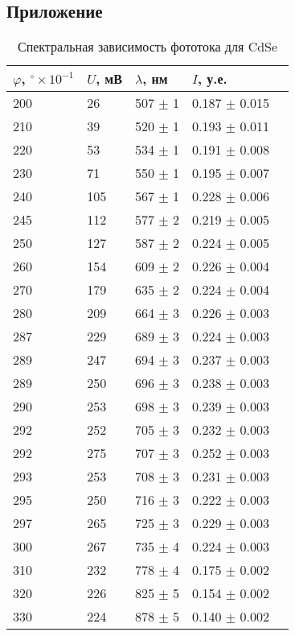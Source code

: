 \subsection*{Приложение}



\begin{table}[h]
    \centering
    \caption{Спектральная зависимость фототока для CdSe}
\begin{tabular}{lllll}
\toprule
$\varphi$, ${}^{\circ} \times 10^{-1} $ &
$U$, мВ &           
$\lambda$, нм &
$I$, у.е.& \\
\midrule
200 &   26 &  507 $\pm$ 1 &    0.187 $\pm$ 0.015 \\
210 &   39 &  520 $\pm$ 1 &    0.193 $\pm$ 0.011 \\
220 &   53 &  534 $\pm$ 1 &  0.191 $\pm$ 0.008 \\
230 &   71 &  550 $\pm$ 1 &  0.195 $\pm$ 0.007 \\
240 &  105 &  567 $\pm$ 1 &  0.228 $\pm$ 0.006 \\
245 &  112 &  577 $\pm$ 2 &   0.219 $\pm$ 0.005 \\
250 &  127 &  587 $\pm$ 2 &  0.224 $\pm$ 0.005 \\
260 &  154 &  609 $\pm$ 2 &  0.226 $\pm$ 0.004 \\
270 &  179 &  635 $\pm$ 2 &  0.224 $\pm$ 0.004 \\
280 &  209 &  664 $\pm$ 3 &   0.226 $\pm$ 0.003 \\
287 &  229 &  689 $\pm$ 3 &  0.224 $\pm$ 0.003 \\
289 &  247 &  694 $\pm$ 3 &   0.237 $\pm$ 0.003 \\
289 &  250 &  696 $\pm$ 3 &  0.238 $\pm$ 0.003 \\
290 &  253 &  698 $\pm$ 3 &  0.239 $\pm$ 0.003 \\
292 &  252 &  705 $\pm$ 3 &  0.232 $\pm$ 0.003 \\
292 &  275 &  707 $\pm$ 3 &  0.252 $\pm$ 0.003 \\
293 &  253 &  708 $\pm$ 3 &   0.231 $\pm$ 0.003 \\
295 &  250 &  716 $\pm$ 3 &  0.222 $\pm$ 0.003 \\
297 &  265 &  725 $\pm$ 3 &  0.229 $\pm$ 0.003 \\
300 &  267 &  735 $\pm$ 4 &   0.224 $\pm$ 0.003 \\
310 &  232 &  778 $\pm$ 4 &  0.175 $\pm$ 0.002 \\
320 &  226 &  825 $\pm$ 5 &   0.154 $\pm$ 0.002 \\
330 &  224 &  878 $\pm$ 5 &  0.140 $\pm$ 0.002 \\
\bottomrule
\end{tabular}
\end{table}


